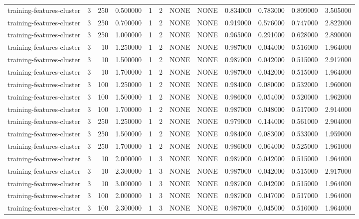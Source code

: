 \begin{tabular}{lrrrllllrrrr}
training-features-cluster & 3 & 250 & 0.500000 & 1 & 2 & NONE & NONE & 0.834000 & 0.783000 & 0.809000 & 3.505000 \\
training-features-cluster & 3 & 250 & 0.700000 & 1 & 2 & NONE & NONE & 0.919000 & 0.576000 & 0.747000 & 2.822000 \\
training-features-cluster & 3 & 250 & 1.000000 & 1 & 2 & NONE & NONE & 0.965000 & 0.291000 & 0.628000 & 2.890000 \\
training-features-cluster & 3 & 10 & 1.250000 & 1 & 2 & NONE & NONE & 0.987000 & 0.044000 & 0.516000 & 1.964000 \\
training-features-cluster & 3 & 10 & 1.500000 & 1 & 2 & NONE & NONE & 0.987000 & 0.042000 & 0.515000 & 2.917000 \\
training-features-cluster & 3 & 10 & 1.700000 & 1 & 2 & NONE & NONE & 0.987000 & 0.042000 & 0.515000 & 1.964000 \\
training-features-cluster & 3 & 100 & 1.250000 & 1 & 2 & NONE & NONE & 0.984000 & 0.080000 & 0.532000 & 1.960000 \\
training-features-cluster & 3 & 100 & 1.500000 & 1 & 2 & NONE & NONE & 0.986000 & 0.054000 & 0.520000 & 1.962000 \\
training-features-cluster & 3 & 100 & 1.700000 & 1 & 2 & NONE & NONE & 0.987000 & 0.048000 & 0.517000 & 2.914000 \\
training-features-cluster & 3 & 250 & 1.250000 & 1 & 2 & NONE & NONE & 0.979000 & 0.144000 & 0.561000 & 2.904000 \\
training-features-cluster & 3 & 250 & 1.500000 & 1 & 2 & NONE & NONE & 0.984000 & 0.083000 & 0.533000 & 1.959000 \\
training-features-cluster & 3 & 250 & 1.700000 & 1 & 2 & NONE & NONE & 0.986000 & 0.064000 & 0.525000 & 1.961000 \\
training-features-cluster & 3 & 10 & 2.000000 & 1 & 3 & NONE & NONE & 0.987000 & 0.042000 & 0.515000 & 1.964000 \\
training-features-cluster & 3 & 10 & 2.300000 & 1 & 3 & NONE & NONE & 0.987000 & 0.042000 & 0.515000 & 2.917000 \\
training-features-cluster & 3 & 10 & 3.000000 & 1 & 3 & NONE & NONE & 0.987000 & 0.042000 & 0.515000 & 1.964000 \\
training-features-cluster & 3 & 100 & 2.000000 & 1 & 3 & NONE & NONE & 0.987000 & 0.047000 & 0.517000 & 1.964000 \\
training-features-cluster & 3 & 100 & 2.300000 & 1 & 3 & NONE & NONE & 0.987000 & 0.045000 & 0.516000 & 1.964000 \\

\end{tabular}
